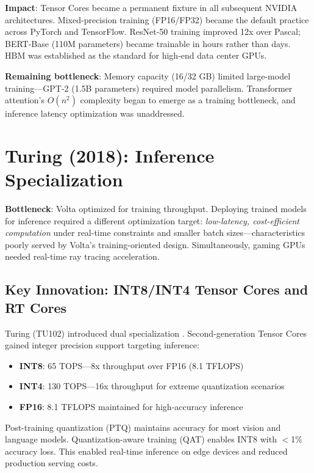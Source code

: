 \documentclass{article}
\begin{document}
\textbf{Impact}: Tensor Cores became a permanent fixture in all subsequent NVIDIA architectures. Mixed-precision training (FP16/FP32) became the default practice across PyTorch and TensorFlow. ResNet-50 training improved 12x over Pascal; BERT-Base (110M parameters) became trainable in hours rather than days. HBM was established as the standard for high-end data center GPUs.

\textbf{Remaining bottleneck}: Memory capacity (16/32 GB) limited large-model training—GPT-2 (1.5B parameters) required model parallelism. Transformer attention's $O(n^2)$ complexity began to emerge as a training bottleneck, and inference latency optimization was unaddressed.

\section{Turing (2018): Inference Specialization}

\textbf{Bottleneck}: Volta optimized for training throughput. Deploying trained models for inference required a different optimization target: \textit{low-latency, cost-efficient computation} under real-time constraints and smaller batch sizes—characteristics poorly served by Volta's training-oriented design. Simultaneously, gaming GPUs needed real-time ray tracing acceleration.

\subsection{Key Innovation: INT8/INT4 Tensor Cores and RT Cores}

Turing (TU102) introduced dual specialization \cite{nvidia2018turing}. Second-generation Tensor Cores gained integer precision support targeting inference:
\begin{itemize}
\item \textbf{INT8}: 65 TOPS—8x throughput over FP16 (8.1 TFLOPS)
\item \textbf{INT4}: 130 TOPS—16x throughput for extreme quantization scenarios
\item \textbf{FP16}: 8.1 TFLOPS maintained for high-accuracy inference
\end{itemize}

Post-training quantization (PTQ) maintains accuracy for most vision and language models. Quantization-aware training (QAT) enables INT8 with $<$1\% accuracy loss. This enabled real-time inference on edge devices and reduced production serving costs.
\end{document}
